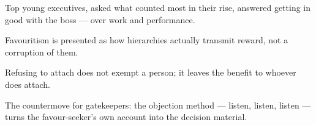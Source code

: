 

\begin{distilled}
  \item Top young executives, asked what counted most in their rise, answered getting in good with the boss --- over work and performance.
  \item Favouritism is presented as how hierarchies actually transmit reward, not a corruption of them.
  \item Refusing to attach does not exempt a person; it leaves the benefit to whoever does attach.
  \item The countermove for gatekeepers: the objection method --- listen, listen, listen --- turns the favour-seeker's own account into the decision material.
\end{distilled}
